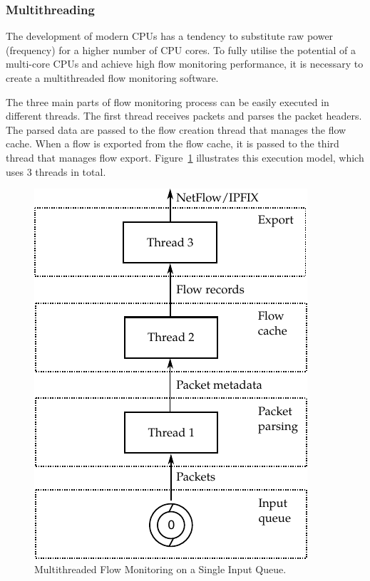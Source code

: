 \subsubsection{Multithreading}

The development of modern CPUs has a tendency to substitute raw power (frequency) for a higher number of CPU cores. To fully utilise the potential of a multi-core CPUs and achieve high flow monitoring performance, it is necessary to create a multithreaded flow monitoring software.

The three main parts of flow monitoring process can be easily executed in different threads. The first thread receives packets and parses the packet headers. The parsed data are passed to the flow creation thread that manages the flow cache. When a flow is exported from the flow cache, it is passed to the third thread that manages flow export. Figure~\ref{fig:exporter-thread-noRSS} illustrates this execution model, which uses $3$ threads in total.

\begin{figure}[t!]
  \begin{center}
    \includegraphics{figures/c05/exporter-thread-noRSS}
  \end{center}
  \caption{Multithreaded Flow Monitoring on a Single Input Queue.}
  \label{fig:exporter-thread-noRSS}
\end{figure}



